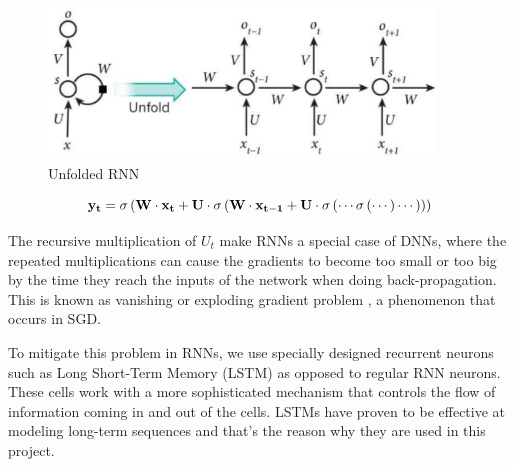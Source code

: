 \begin{figure}
    \centering
    \includegraphics[height=4cm]{figures/unfold}
    \caption{Unfolded RNN}
    \label{fig:unfold}
\end{figure}

\begin{equation}
    \centering
    \mathbf{y_t} = \sigma \left ( \mathbf{W} \cdot \mathbf{x_t} + \mathbf{U} \cdot \sigma \left ( \mathbf{W} \cdot \mathbf{x_{t-1}} + \mathbf{U} \cdot \sigma \left ( \cdots \sigma \left ( \cdots \right ) \cdots \right ) \right ) \right )
    \label{eq:out-rec-expanded}
\end{equation}

The recursive multiplication of $U_t$ make RNNs a special case of DNNs, where the repeated multiplications can cause the gradients to become too small or too big by the time they reach the inputs of the network when doing back-propagation. This is known as vanishing or exploding gradient problem \cite{bengio1994learning}, a phenomenon that occurs in SGD.

To mitigate this problem in RNNs, we use specially designed recurrent neurons such as Long Short-Term Memory \cite{hochreiter1997long} (LSTM) as opposed to regular RNN neurons. These cells work with a more sophisticated mechanism that controls the flow of information coming in and out of the cells. LSTMs have proven to be effective at modeling long-term sequences and that's the reason why they are used in this project.

